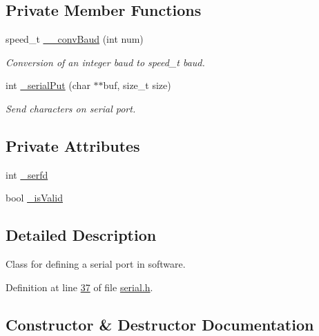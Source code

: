 \subsection*{Private Member Functions}
\begin{DoxyCompactItemize}
\item 
speed\+\_\+t \mbox{\hyperlink{classFOHSerial_adad9afc88e0b6626d623fc19abb41c90}{\+\_\+\+\_\+conv\+Baud}} (int num)
\begin{DoxyCompactList}\small\item\em Conversion of an integer baud to speed\+\_\+t baud. \end{DoxyCompactList}\item 
int \mbox{\hyperlink{classFOHSerial_add9b2e556b56459b2eddc9b71f5c80ed}{\+\_\+serial\+Put}} (char $\ast$$\ast$buf, size\+\_\+t size)
\begin{DoxyCompactList}\small\item\em Send characters on serial port. \end{DoxyCompactList}\end{DoxyCompactItemize}
\subsection*{Private Attributes}
\begin{DoxyCompactItemize}
\item 
int \mbox{\hyperlink{classFOHSerial_ab682f6f446d38c7954dfb9cae43b6c73}{\+\_\+serfd}}
\item 
bool \mbox{\hyperlink{classFOHSerial_a26a5f17316ae345ebbdb8d99d3ad2a84}{\+\_\+is\+Valid}}
\end{DoxyCompactItemize}


\subsection{Detailed Description}
Class for defining a serial port in software. 

Definition at line \mbox{\hyperlink{serial_8h_source_l00037}{37}} of file \mbox{\hyperlink{serial_8h_source}{serial.\+h}}.



\subsection{Constructor \& Destructor Documentation}
\mbox{\label{classFOHSerial_a9d043cc8235a679af5c1dc68595fba02}} 
